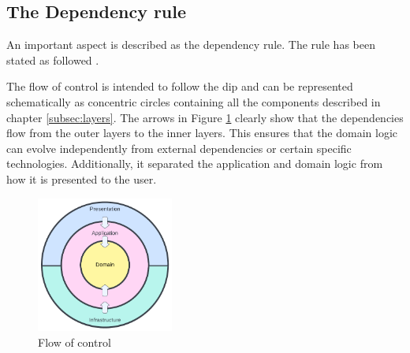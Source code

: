 \subsection{The Dependency rule} \label{sebsec:dependency_rule}

An important aspect is described as the dependency rule. The rule has been stated as
followed \parencite[206]{robert_c_martin_clean_2018}.


The flow of control is intended to follow the \gls{dip} and can be represented
schematically as concentric circles containing all the components described in chapter
\ref{subsec:layers}. The arrows in Figure \ref{fig:modulair_components} clearly show that
the dependencies flow from the outer layers to the inner layers. This ensures that the
domain logic can evolve independently from external dependencies or certain specific
technologies. Additionally, it separated the application and domain logic from how it is
presented to the user. 

\begin{figure}[H]
    \centering
    \includegraphics[width=0.4\textwidth]{Figures/ca_diagram.pdf}
    \caption[modularity]{Flow of control}
    \label{fig:modulair_components}
\end{figure}
